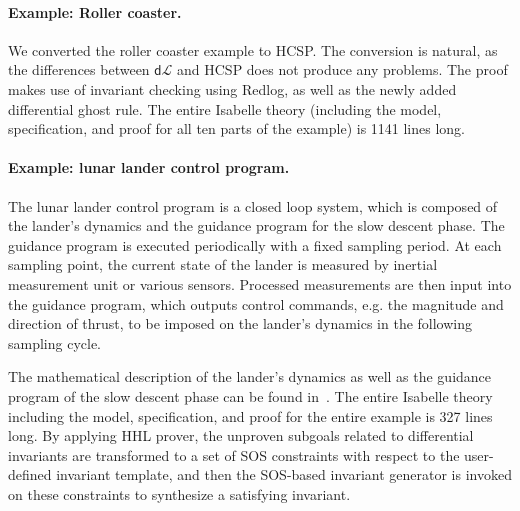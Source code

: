 \documentclass[runningheads,a4paper]{llncs}
\newcommand{\dL}{\mathsf{d}\mathcal{L}}
\begin{document}
\paragraph{Example: Roller coaster.}

We converted the roller coaster example \cite{coasterx} to HCSP. The
conversion is natural, as the differences between $\dL$ and HCSP does
not produce any problems. The proof makes use of invariant checking
using Redlog, as well as the newly added differential ghost rule. The
entire Isabelle theory (including the model, specification, and proof
for all ten parts of the example) is 1141 lines long.

\paragraph{Example: lunar lander control program.}

The lunar lander control program is a closed loop system, which is
composed of the lander's dynamics and the guidance program for the
slow descent phase. The guidance program is executed periodically with
a fixed sampling period. At each sampling point, the current state of
the lander is measured by inertial measurement unit or various
sensors. Processed measurements are then input into the guidance
program, which outputs control commands, e.g. the magnitude and
direction of thrust, to be imposed on the lander's dynamics in the
following sampling cycle.

The mathematical description of the lander's dynamics as well as the
guidance program of the slow descent phase can be found
in~\cite{ZYZG14,ZhanWZ16}. The entire Isabelle theory including the
model, specification, and proof for the entire example is 327 lines
long. By applying HHL prover, the unproven subgoals related to
differential invariants are transformed to a set of SOS constraints
with respect to the user-defined invariant template, and then the
SOS-based invariant generator is invoked on these constraints to
synthesize a satisfying invariant.




\end{document}
